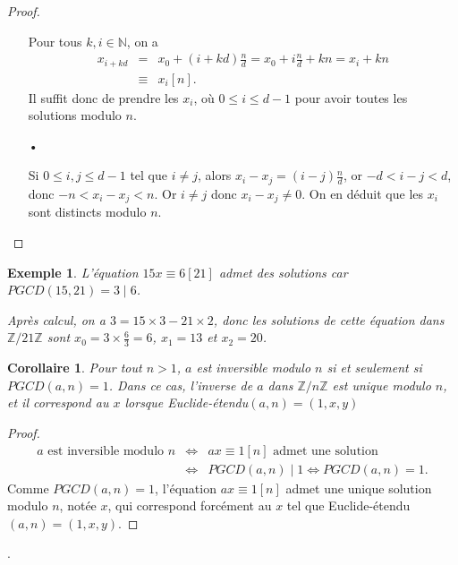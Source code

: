 \documentclass[10pt,a4paper]{report}
\newtheorem*{ex}{Exemple}
\newtheorem{Cor}[thm]{Corollaire}
\begin{document}
\begin{proof}
\begin{itemize}
Pour tous $k,i \in \mathbb{N}$, on a 
\begin{eqnarray*}
x_{i+kd}&=& x_0+(i+kd) \tfrac{n}{d}= x_0+i \tfrac{n}{d}+kn =x_i +kn\\
             & \equiv & x_i [n].
\end{eqnarray*}
Il suffit donc de prendre les $x_i$, où $0 \leqslant i \leqslant d-1$ pour avoir toutes les solutions modulo $n$.
\item[•]  \par 
Si $0 \leqslant i,j  \leqslant d-1$ tel que $i \neq j$, alors $x_i-x_j=(i-j)\tfrac{n}{d}$, or $-d<i-j<d$, donc $-n< x_i-x_j < n$. Or $i \neq j$ donc $x_i-x_j \neq 0$. On en déduit que les $x_i$ sont distincts modulo $n$.
\end{itemize}
\end{proof}

\begin{ex}
L'équation $15 x \equiv 6 [21]$ admet des solutions car $PGCD(15,21)=3 \mid 6$. \par 
Après calcul, on a $3= 15 \times 3 - 21 \times 2$, donc les solutions de cette équation dans $\mathbb{Z}/21 \mathbb{Z}$ sont $x_0=3 \times \tfrac63=6$, $x_1=13$ et $x_2=20$. 
\end{ex}

\begin{Cor}\label{co28}
Pour tout $n >1$, $a$ est inversible modulo $n$ si et seulement si $PGCD(a,n)=1$. Dans ce cas, l'inverse de $a$ dans $\mathbb{Z}/n\mathbb{Z}$ est unique modulo $n$, et il correspond au $x$ lorsque Euclide-étendu$(a,n)=(1,x,y)$ 
\end{Cor}

\begin{proof}
\begin{eqnarray*}
a \text{ est inversible modulo }n & \Longleftrightarrow & ax \equiv 1 [n] \text{ admet une solution} \\
      & \Longleftrightarrow & PGCD(a,n)\mid 1 \Longleftrightarrow PGCD(a,n)=1.
\end{eqnarray*}
Comme $PGCD(a,n)=1$, l'équation $ax \equiv 1 [n]$ admet une unique solution modulo $n$, notée $x$, qui correspond forcément au $x$ tel que Euclide-étendu$(a,n)=(1,x,y)$.
\end{proof}


.
\end{document}
